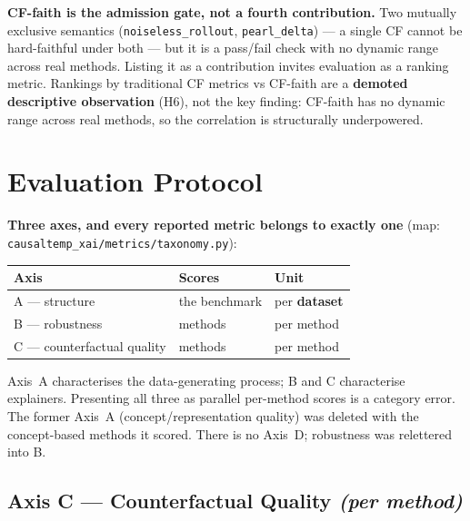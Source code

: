 \documentclass[11pt]{article}
\begin{document}
\noindent\textbf{CF-faith is the admission gate, not a fourth
contribution.} Two mutually exclusive semantics
(\texttt{noiseless\_rollout}, \texttt{pearl\_delta}) --- a single CF
cannot be hard-faithful under both --- but it is a pass/fail check with no
dynamic range across real methods. Listing it as a contribution invites
evaluation as a ranking metric. Rankings by traditional CF metrics vs
CF-faith are a \textbf{demoted descriptive observation} (H6), not the key
finding: CF-faith has no dynamic range across real methods, so the
correlation is structurally underpowered.

\section{Evaluation Protocol}
\label{sec:protocol}

\textbf{Three axes, and every reported metric belongs to exactly one}
(map: \texttt{causaltemp\_xai/metrics/taxonomy.py}):

\begin{center}
\begin{tabular}{@{}lll@{}}
  \toprule
  \textbf{Axis} & \textbf{Scores} & \textbf{Unit} \\
  \midrule
  A --- structure & the benchmark & per \textbf{dataset} \\
  B --- robustness & methods & per method \\
  C --- counterfactual quality & methods & per method \\
  \bottomrule
\end{tabular}
\end{center}

Axis~A characterises the data-generating process; B and C characterise
explainers. Presenting all three as parallel per-method scores is a
category error. The former Axis~A (concept/representation quality) was
deleted with the concept-based methods it scored. There is no Axis~D;
robustness was relettered into B.

\subsection{Axis C --- Counterfactual Quality \emph{(per method)}}
\end{document}

